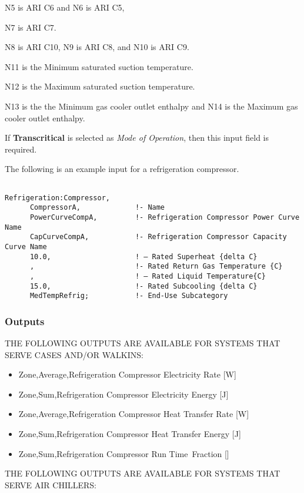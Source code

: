 N5 is ARI C6 and N6 is ARI C5,

N7 is ARI C7.

N8 is ARI C10, N9 is ARI C8, and N10 is ARI C9.

N11 is the Minimum saturated suction temperature.

N12 is the Maximum saturated suction temperature.

N13 is the the Minimum gas cooler outlet enthalpy and N14 is the Maximum gas cooler outlet enthalpy.

If \textbf{Transcritical} is selected as \textit{Mode of Operation}, then this input field is required.

The following is an example input for a refrigeration compressor.

\begin{lstlisting}

Refrigeration:Compressor,
      CompressorA,             !- Name
      PowerCurveCompA,         !- Refrigeration Compressor Power Curve Name
      CapCurveCompA,           !- Refrigeration Compressor Capacity Curve Name
      10.0,                    ! – Rated Superheat {delta C}
      ,                        !- Rated Return Gas Temperature {C}
      ,                        ! – Rated Liquid Temperature{C}
      15.0,                    !- Rated Subcooling {delta C}
      MedTempRefrig;           !- End-Use Subcategory
\end{lstlisting}

\subsubsection{Outputs}\label{outputs-4-013}

THE FOLLOWING OUTPUTS ARE AVAILABLE FOR SYSTEMS THAT SERVE CASES AND/OR WALKINS:

\begin{itemize}
\item
  Zone,Average,Refrigeration Compressor Electricity Rate {[}W{]}
\item
  Zone,Sum,Refrigeration Compressor Electricity Energy {[}J{]}
\item
  Zone,Average,Refrigeration Compressor Heat Transfer Rate {[}W{]}
\item
  Zone,Sum,Refrigeration Compressor Heat Transfer Energy {[}J{]}
\item
  Zone,Sum,Refrigeration Compressor Run Time~Fraction {[]}
\end{itemize}

THE FOLLOWING OUTPUTS ARE AVAILABLE FOR SYSTEMS THAT SERVE AIR CHILLERS:

